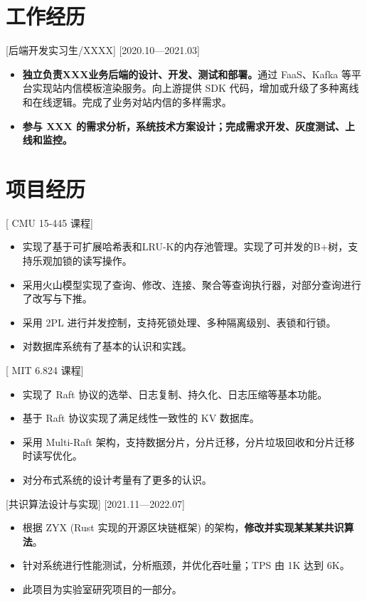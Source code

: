 \documentclass{resume}
\begin{document}
\section{工作经历}

[后端开发实习生/XXXX]
[2020.10—2021.03] 

\begin{itemize}
  \item \textbf{独立负责XXX业务后端的设计、开发、测试和部署。}通过 FaaS、Kafka 等平台实现站内信模板渲染服务。向上游提供 SDK 代码，增加或升级了多种离线和在线逻辑。完成了业务对站内信的多样需求。
  \item \textbf{参与 XXX 的需求分析，系统技术方案设计；完成需求开发、灰度测试、上线和监控。}
\end{itemize}

\section{项目经历}

[ \textnormal{CMU 15-445} 课程]
\begin{itemize}
  \item 实现了基于可扩展哈希表和LRU-K的内存池管理。实现了可并发的B+树，支持乐观加锁的读写操作。
  \item 采用火山模型实现了查询、修改、连接、聚合等查询执行器，对部分查询进行了改写与下推。
  \item 采用 2PL 进行并发控制，支持死锁处理、多种隔离级别、表锁和行锁。
  \item 对数据库系统有了基本的认识和实践。
\end{itemize}


[ \textnormal{MIT 6.824} 课程]
\begin{itemize}
  \item 实现了 Raft 协议的选举、日志复制、持久化、日志压缩等基本功能。
  \item 基于 Raft 协议实现了满足线性一致性的 KV 数据库。
  \item 采用 Multi-Raft 架构，支持数据分片，分片迁移，分片垃圾回收和分片迁移时读写优化。
  \item 对分布式系统的设计考量有了更多的认识。
\end{itemize}

[共识算法设计与实现]
[2021.11—2022.07] 

\begin{itemize}
  \item 根据 ZYX (Rust 实现的开源区块链框架) 的架构，\textbf{修改并实现某某某共识算法}。
  \item 针对系统进行性能测试，分析瓶颈，并优化吞吐量；TPS 由 1K 达到 6K。
  \item 此项目为实验室研究项目的一部分。
\end{itemize}
\end{document}
